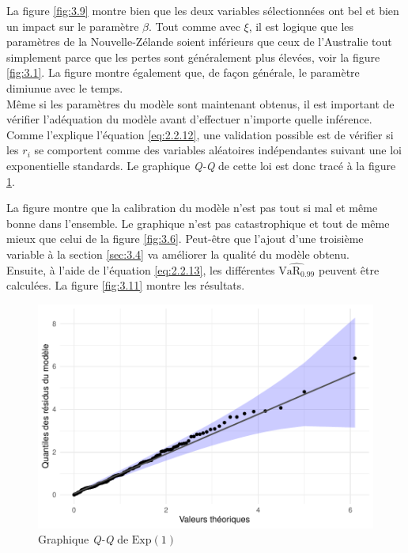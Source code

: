 La figure \ref{fig:3.9} montre bien que les deux variables sélectionnées ont bel et bien un impact sur le paramètre $\beta$. Tout comme avec $\xi$, il est logique que les paramètres de la Nouvelle-Zélande soient inférieurs que ceux de l'Australie tout simplement parce que les pertes sont généralement plus élevées, voir la figure \ref{fig:3.1}. La figure montre également que, de façon générale, le paramètre dimiunue avec le temps.
\\

Même si les paramètres du modèle sont maintenant obtenus, il est important de vérifier l'adéquation du modèle avant d'effectuer n'importe quelle inférence. Comme l'explique l'équation \ref{eq:2.2.12}, une validation possible est de vérifier si les $r_i$ se comportent comme des variables aléatoires indépendantes suivant une loi exponentielle standards. Le graphique \textit{Q-Q} de cette loi est donc tracé à la figure \ref{fig:3.10}.

La figure montre que la calibration du modèle n'est pas tout si mal et même bonne dans l'ensemble. Le graphique n'est pas catastrophique et tout de même mieux que celui de la figure \ref{fig:3.6}. Peut-être que l'ajout d'une troisième variable à la section \ref{sec:3.4} va améliorer la qualité du modèle obtenu.
\\

Ensuite, à l'aide de l'équation \ref{eq:2.2.13}, les différentes $\widehat{\text{VaR}_{0.99}}$ peuvent être calculées. La figure \ref{fig:3.11} montre les résultats. 
\begin{figure}[h]
\begin{center}
\includegraphics{images/fig-018}
\end{center}
\caption{Graphique \textit{Q-Q} de $\text{Exp}(1)$}
\label{fig:3.10}
\end{figure}

